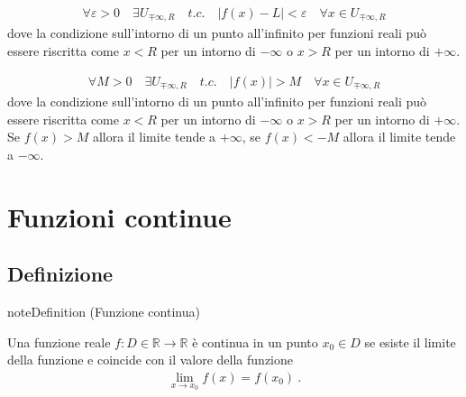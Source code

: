 \documentclass[letterpaper,10pt,italian]{jupyterBook}
\begin{document}
\sphinxAtStartPar
{}
\begin{equation*}
\begin{split}\forall \varepsilon > 0 \quad \exists U_{\mp\infty,R} \quad {t.c.} \quad |f(x) - L| < \varepsilon \quad \forall x \in U_{\mp\infty, R}\end{split}
\end{equation*}
\sphinxAtStartPar
dove la condizione sull’intorno di un punto all’infinito per funzioni reali può essere riscritta come \(x < R\) per un intorno di \(-\infty\) o \(x > R\) per un intorno di \(+\infty\).

\sphinxAtStartPar
{}
\begin{equation*}
\begin{split}\forall M > 0 \quad \exists U_{\mp \infty, R} \quad {t.c.} \quad |f(x)| > M \quad \forall x \in U_{\mp \infty, R}\end{split}
\end{equation*}
\sphinxAtStartPar
dove la condizione sull’intorno di un punto all’infinito per funzioni reali può essere riscritta come \(x < R\) per un intorno di \(-\infty\) o \(x > R\) per un intorno di \(+\infty\). Se \(f(x) > M\) allora il limite tende a \(+\infty\), se \(f(x) < -M\) allora il limite tende a \(-\infty\).


\section{Funzioni continue}
\label{\detokenize{ch/infinitesimal_calculus/analysis:funzioni-continue}}\label{\detokenize{ch/infinitesimal_calculus/analysis:infinitesimal-calculus-continuous-fun}}

\subsection{Definizione}
\label{\detokenize{ch/infinitesimal_calculus/analysis:definizione}}\label{\detokenize{ch/infinitesimal_calculus/analysis:infinitesimal-calculus-continuous-fun-def}}\label{None:analysis-continuous-fun}
\begin{sphinxadmonition}{note}{Definition  (Funzione continua)}



\sphinxAtStartPar
Una funzione reale \(f: D \in \mathbb{R} \rightarrow \mathbb{R}\) è continua in un punto \(x_0 \in D\)  se esiste il limite della funzione e coincide con il valore della funzione
\begin{equation*}
\begin{split}\lim_{x \rightarrow x_0} f(x) = f(x_0) \ .\end{split}
\end{equation*}\end{sphinxadmonition}
\end{document}
